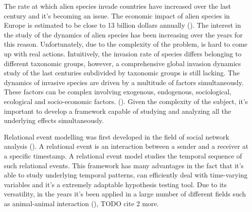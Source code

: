 \documentclass[mscthesis]{usiinfthesis}
\begin{document}
The rate at which alien species invade countries have increased over the last century and it's becoming an issue. The economic impact of alien species in Europe is estimated to be close to 13 billion dollars annually (\citet{intro:rate}). The interest in the study of the dynamics of alien species has been increasing over the years for this reason. Unfortunately, due to the complexity of the problem, is hard to come up with real actions. Intuitively, the invasion rate of species differs belonging to different taxonomic groups, however, a comprehensive global invasion dynamics study of the last centuries subdivided by taxonomic groups is still lacking. The dynamics of invasive species are driven by a multitude of factors simultaneously. These factors can be complex involving exogenous, endogenous, sociological, ecological and socio-economic factors. (\citet{intro:factors}). Given the complexity of the subject, it's important to develop a framework capable of studying and analyzing all the underlying effects simultaneously. 

Relational event modelling was first developed in the field of social network analysis (\citet{rem:butts}). A relational event is an interaction between a sender and a receiver at a specific timestamp. A relational event model studies the temporal sequence of such relational events. This framework has many advantages in the fact that it's able to study underlying temporal patterns, can efficiently deal with time-varying variables and it's a extremely adaptable hypothesis testing tool. Due to its versatility, in the years it's been applied in a large number of different fields such as animal-animal interaction (\citet{intro:cattle}), TODO cite 2 more.

%
\end{document}
